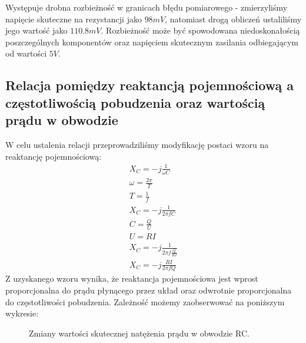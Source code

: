 \documentclass[polish,polish,a4paper]{article}
\begin{document}
Występuje drobna rozbieżność w granicach błędu pomiarowego - zmierzyliśmy napięcie skuteczne na rezystancji jako $98 mV$, natomiast drogą obliczeń ustaliliśmy jego wartość jako $110.8 mV$. Rozbieżność może być spowodowana niedoskonałością poszczególnych komponentów oraz napięciem skutecznym zasilania odbiegającym od wartości $5V$.


\subsection{Relacja pomiędzy reaktancją pojemnościową a częstotliwością pobudzenia oraz wartością prądu w obwodzie}

W celu ustalenia relacji przeprowadziliśmy modyfikację postaci wzoru na reaktancję pojemnościową:
\begin{gather}
X_{C} = -j \frac{1}{\omega C} \\
\omega = \frac{2\pi}{T} \\
T = \frac{1}{f} \\
X_{C} = -j \frac{1}{2\pi fC} \\
C = \frac{Q}{U} \\ 
U = RI \\
X_{C} = -j\frac{1}{2\pi f\frac{Q}{RI}} \\
X_{C} = -j\frac{RI}{2\pi fQ} 
\end{gather}
Z uzyskanego wzoru wynika, że reaktancja pojemnościowa jest wprost proporcjonalna do prądu płynącego przez układ oraz odwrotnie proporcjonalna do częstotliwości pobudzenia. Zależność możemy zaobserwować na poniższym wykresie:
\begin{figure}[H]
\centering
{}
\caption{Zmiany wartości skutecznej natężenia prądu w obwodzie RC.}
\end{figure}
\end{document}
